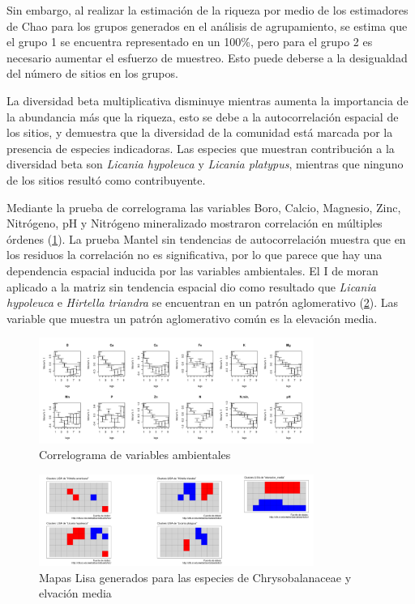 \documentclass[11pt,]{article}
\begin{document}
Sin embargo, al realizar la estimación de la riqueza por medio de los
estimadores de Chao para los grupos generados en el análisis de
agrupamiento, se estima que el grupo 1 se encuentra representado en un
100\%, pero para el grupo 2 es necesario aumentar el esfuerzo de
muestreo. Esto puede deberse a la desigualdad del número de sitios en
los grupos.

La diversidad beta multiplicativa disminuye mientras aumenta la
importancia de la abundancia más que la riqueza, esto se debe a la
autocorrelación espacial de los sitios, y demuestra que la diversidad de
la comunidad está marcada por la presencia de especies indicadoras. Las
especies que muestran contribución a la diversidad beta son
\emph{Licania hypoleuca} y \emph{Licania platypus}, mientras que ninguno
de los sitios resultó como contribuyente.

Mediante la prueba de correlograma las variables Boro, Calcio, Magnesio,
Zinc, Nitrógeno, pH y Nitrógeno mineralizado mostraron correlación en
múltiples órdenes (\ref{correlograma}). La prueba Mantel sin tendencias
de autocorrelación muestra que en los residuos la correlación no es
significativa, por lo que parece que hay una dependencia espacial
inducida por las variables ambientales. El I de moran aplicado a la
matriz sin tendencia espacial dio como resultado que \emph{Licania
hypoleuca} e \emph{Hirtella triandra} se encuentran en un patrón
aglomerativo (\ref{lisamaps}). Las variable que muestra un patrón
aglomerativo común es la elevación media.

\begin{figure}
\centering
\includegraphics[width=0.80000\textwidth]{correlogramavariables.png}
\caption{Correlograma de variables ambientales\label{correlograma}}
\end{figure}

\begin{figure}
\centering
\includegraphics[width=0.80000\textwidth]{clusterlisaespecies.png}
\caption{Mapas Lisa generados para las especies de Chrysobalanaceae y
elvación media\label{lisamaps}}
\end{figure}
\end{document}

